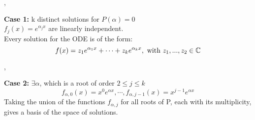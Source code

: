 \sep

\textbf{Case 1:} k distinct solutions for $P(\alpha) = 0$ \\
$f_j(x) = e^{\alpha_j x}$ are linearly independent. \\

Every solution for the ODE is of the form:
\[ f(x) = z_1 e^{\alpha_1 x} + \cdots + z_k e^{\alpha_k x}, \text{ with }  z_1, ..., z_2 \in \mathbb{C}\]

\sep

\textbf{Case 2:} $\exists \alpha$, which is a root of order $2 \leq j \leq k$
\[ f_{\alpha, 0}(x) = x^0 e^{\alpha x}, \cdots, f_{\alpha, j - 1}(x) = x^{j - 1}  e^{\alpha x}\]
Taking the union of the functions $f_{\alpha, j}$ for all roots of P, each with its multiplicity, gives a basis of the space of solutions. 